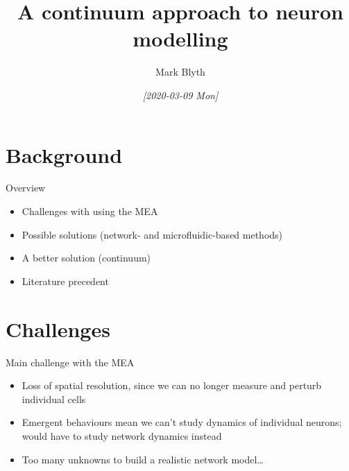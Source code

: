 \documentclass[presentation]{beamer}
\author{Mark Blyth}
\date{\textit{[2020-03-09 Mon]}}
\title{A continuum approach to neuron modelling}
\begin{document}
\maketitle

\section{Background}
\label{sec:org77a7e72}
\begin{frame}[label={sec:org866023a}]{Overview}
\begin{itemize}
\item Challenges with using the MEA
\item Possible solutions (network- and microfluidic-based methods)
\item A better solution (continuum)
\item Literature precedent
\end{itemize}
\end{frame}

\section{Challenges}
\label{sec:org4eeada4}
\begin{frame}[label={sec:org244baa3}]{Main challenge with the MEA}
\begin{itemize}
\item Loss of spatial resolution, since we can no longer measure and perturb individual cells
\item Emergent behaviours mean we can't study dynamics of individual neurons; would have to study network dynamics instead
\item Too many unknowns to build a realistic network model\ldots{}
\end{itemize}
\end{frame}
\end{document}
